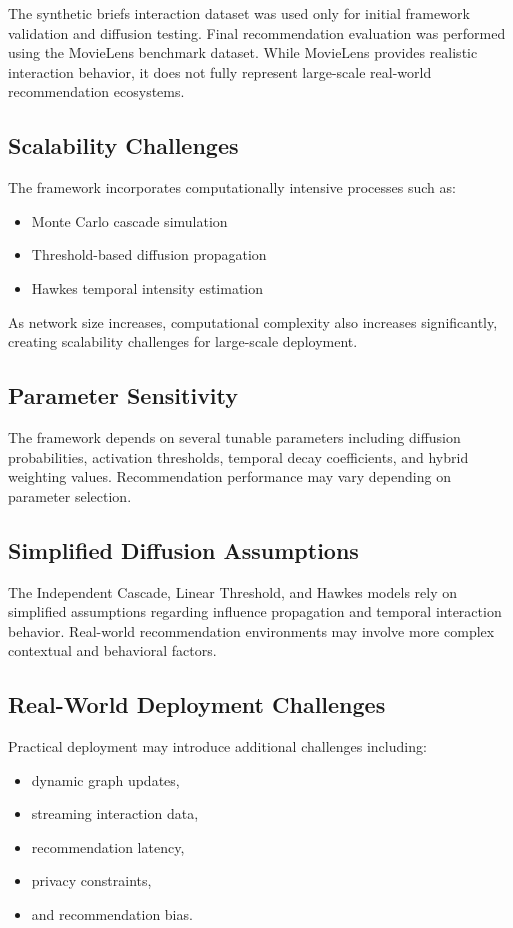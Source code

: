 \documentclass{article}
\begin{document}
The synthetic briefs interaction dataset was used only for initial framework validation and diffusion testing. Final recommendation evaluation was performed using the MovieLens benchmark dataset. While MovieLens provides realistic interaction behavior, it does not fully represent large-scale real-world recommendation ecosystems.

\subsection{Scalability Challenges}

The framework incorporates computationally intensive processes such as:
\begin{itemize}
\item Monte Carlo cascade simulation
\item Threshold-based diffusion propagation
\item Hawkes temporal intensity estimation
\end{itemize}

As network size increases, computational complexity also increases significantly, creating scalability challenges for large-scale deployment.

\subsection{Parameter Sensitivity}

The framework depends on several tunable parameters including diffusion probabilities, activation thresholds, temporal decay coefficients, and hybrid weighting values. Recommendation performance may vary depending on parameter selection.

\subsection{Simplified Diffusion Assumptions}

The Independent Cascade, Linear Threshold, and Hawkes models rely on simplified assumptions regarding influence propagation and temporal interaction behavior. Real-world recommendation environments may involve more complex contextual and behavioral factors.

\subsection{Real-World Deployment Challenges}

Practical deployment may introduce additional challenges including:
\begin{itemize}
\item dynamic graph updates,
\item streaming interaction data,
\item recommendation latency,
\item privacy constraints,
\item and recommendation bias.
\end{itemize}
\end{document}
